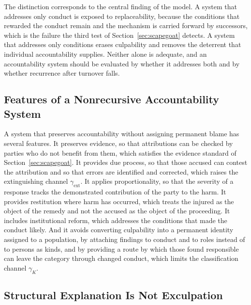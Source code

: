 \documentclass[12pt]{article}
\theoremstyle{remark}
\begin{document}
The distinction corresponds to the central finding of the model. A system that addresses only conduct is exposed to replaceability, because the conditions that rewarded the conduct remain and the mechanism is carried forward by successors, which is the failure the third test of Section~\ref{sec:scapegoat} detects. A system that addresses only conditions erases culpability and removes the deterrent that individual accountability supplies. Neither alone is adequate, and an accountability system should be evaluated by whether it addresses both and by whether recurrence after turnover falls.

\subsection{Features of a Nonrecursive Accountability System}

A system that preserves accountability without assigning permanent blame has several features. It preserves evidence, so that attributions can be checked by parties who do not benefit from them, which satisfies the evidence standard of Section~\ref{sec:scapegoat}. It provides due process, so that those accused can contest the attribution and so that errors are identified and corrected, which raises the extinguishing channel $\gamma_{\mathrm{ext}}$. It applies proportionality, so that the severity of a response tracks the demonstrated contribution of the party to the harm. It provides restitution where harm has occurred, which treats the injured as the object of the remedy and not the accused as the object of the proceeding. It includes institutional reform, which addresses the conditions that made the conduct likely. And it avoids converting culpability into a permanent identity assigned to a population, by attaching findings to conduct and to roles instead of to persons as kinds, and by providing a route by which those found responsible can leave the category through changed conduct, which limits the classification channel $\gamma_K$.

\subsection{Structural Explanation Is Not Exculpation}
\end{document}
